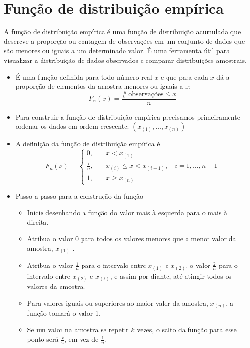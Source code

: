 \documentclass[
]{book}
\providecommand{\tightlist}{%
  \setlength{\itemsep}{0pt}\setlength{\parskip}{0pt}}
\begin{document}
\section{Função de distribuição empírica}\label{funuxe7uxe3o-de-distribuiuxe7uxe3o-empuxedrica}

A função de distribuição empírica é uma função de distribuição acumulada
que descreve a proporção ou contagem de observações em um conjunto de
dados que são menores ou iguais a um determinado valor. É uma ferramenta
útil para visualizar a distribuição de dados observados e comparar
distribuições amostrais.

\begin{itemize}
\item
  É uma função definida para todo número real \(x\) e que para cada \(x\)
  dá a proporção de elementos da amostra menores ou iguais a \(x\):
  \[F_{n}(x) = \frac{\# \, \text{observações} \leq x}{n}\]
\item
  Para construir a função de distribuição empírica precisamos
  primeiramente ordenar os dados em ordem crescente:
  \((x_{(1)},\ldots,x_{(n)})\)
\item
  A definição da função de distribuição empírica é
  \[F_{n}(x) = \begin{cases}
    0, & \quad x < x_{(1)} \\
    \frac{i}{n}, & \quad x_{(i)}\leq x < x_{(i+1)}, \quad i=1,\ldots,n-1 \\
    1, & \quad x\geq x_{(n)}
  \end{cases}\]
\item
  Passo a passo para a construção da função

  \begin{itemize}
  \tightlist
  \item
    Inicie desenhando a função do valor mais à esquerda para o mais
    à direita.
  \item
    Atribua o valor 0 para todos os valores menores que o menor
    valor da amostra, \(x_{(1)}\) .
  \item
    Atribua o valor \(\frac{1}{n}\) para o intervalo entre \(x_{(1)}\) e
    \(x_{(2)}\), o valor \(\frac{2}{n}\) para o intervalo entre
    \(x_{(2)}\) e \(x_{(3)}\), e assim por diante, até atingir todos os
    valores da amostra.
  \item
    Para valores iguais ou superiores ao maior valor da amostra,
    \(x_{(n)}\), a função tomará o valor 1.
  \item
    Se um valor na amostra se repetir \(k\) vezes, o salto da função
    para esse ponto será \(\frac{k}{n}\), em vez de \(\frac{1}{n}\).
  \end{itemize}
\end{itemize}
\end{document}

